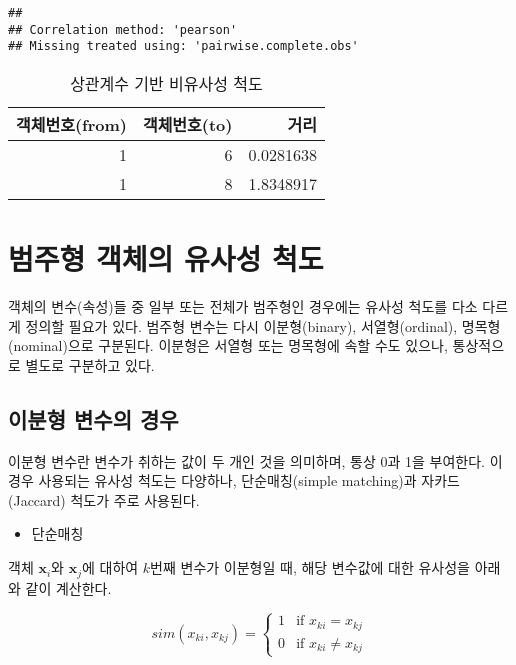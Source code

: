 \documentclass[
]{book}
\providecommand{\tightlist}{%
  \setlength{\itemsep}{0pt}\setlength{\parskip}{0pt}}
\begin{document}
\begin{verbatim}
## 
## Correlation method: 'pearson'
## Missing treated using: 'pairwise.complete.obs'
\end{verbatim}

\begin{table}

\caption{\label{tab:std-correlation-dissimilarity}상관계수 기반 비유사성 척도}
\centering
\begin{tabular}[t]{rrr}
\toprule
객체번호(from) & 객체번호(to) & 거리\\
\midrule
1 & 6 & 0.0281638\\
1 & 8 & 1.8348917\\
\bottomrule
\end{tabular}
\end{table}

\hypertarget{category-similarity-metric}{%
\section{범주형 객체의 유사성 척도}\label{category-similarity-metric}}

객체의 변수(속성)들 중 일부 또는 전체가 범주형인 경우에는 유사성 척도를 다소 다르게 정의할 필요가 있다. 범주형 변수는 다시 이분형(binary), 서열형(ordinal), 명목형(nominal)으로 구분된다. 이분형은 서열형 또는 명목형에 속할 수도 있으나, 통상적으로 별도로 구분하고 있다.

\hypertarget{binary-similarity-metric}{%
\subsection{이분형 변수의 경우}\label{binary-similarity-metric}}

이분형 변수란 변수가 취하는 값이 두 개인 것을 의미하며, 통상 0과 1을 부여한다. 이 경우 사용되는 유사성 척도는 다양하나, 단순매칭(simple matching)과 자카드(Jaccard) 척도가 주로 사용된다.

\begin{itemize}
\tightlist
\item
  단순매칭
\end{itemize}

객체 \(\mathbf{x}_i\)와 \(\mathbf{x}_j\)에 대하여 \(k\)번째 변수가 이분형일 때, 해당 변수값에 대한 유사성을 아래와 같이 계산한다.

\begin{equation*}
sim(x_{ki}, x_{kj}) = \begin{cases}
1 & \text{if } x_{ki} = x_{kj}\\
0 & \text{if } x_{ki} \neq x_{kj}
\end{cases}
\end{equation*}
\end{document}
